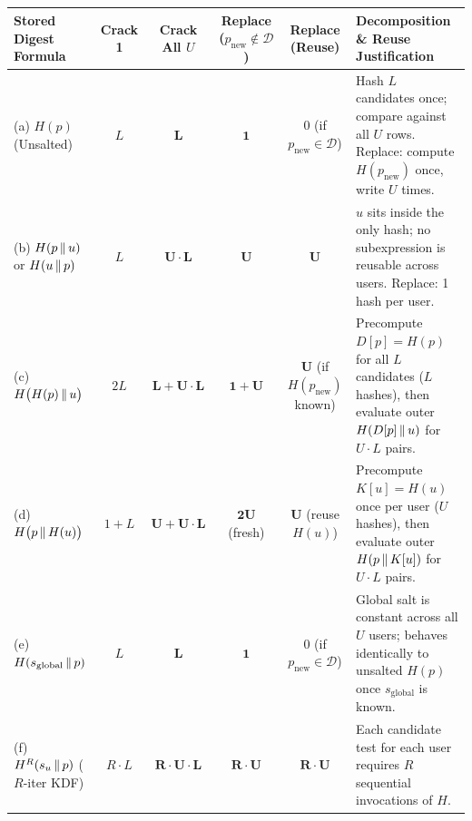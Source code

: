 \begin{table}[h!]
\centering
\footnotesize
\begin{tabularx}{\textwidth}{@{}L{3.5cm} c c c c Y@{}}
\toprule
\textbf{Stored Digest Formula} & \textbf{Crack 1} & \textbf{Crack All $U$} & \textbf{Replace ($p_{\text{new}} \notin \mathcal{D}$)} & \textbf{Replace (Reuse)} & \textbf{Decomposition \& Reuse Justification} \\
\midrule
(a) $H(p)$ (Unsalted) & $L$ & $\mathbf{L}$ & $\mathbf{1}$ & $0$ (if $p_{\text{new}} \in \mathcal{D}$) & Hash $L$ candidates once; compare against all $U$ rows. Replace: compute $H(p_{\text{new}})$ once, write $U$ times. \\
(b) $H(p \,\|\, u)$ or $H(u \,\|\, p)$ & $L$ & $\mathbf{U \cdot L}$ & $\mathbf{U}$ & $\mathbf{U}$ & $u$ sits inside the only hash; no subexpression is reusable across users. Replace: 1 hash per user. \\
(c) $H\big(H(p) \,\|\, u\big)$ & $2L$ & $\mathbf{L + U \cdot L}$ & $\mathbf{1 + U}$ & $\mathbf{U}$ (if $H(p_{\text{new}})$ known) & Precompute $D[p] = H(p)$ for all $L$ candidates ($L$ hashes), then evaluate outer $H(D[p] \,\|\, u)$ for $U \cdot L$ pairs. \\
(d) $H\big(p \,\|\, H(u)\big)$ & $1 + L$ & $\mathbf{U + U \cdot L}$ & $\mathbf{2U}$ (fresh) & $\mathbf{U}$ (reuse $H(u)$) & Precompute $K[u] = H(u)$ once per user ($U$ hashes), then evaluate outer $H(p \,\|\, K[u])$ for $U \cdot L$ pairs. \\
(e) $H(s_{\text{global}} \,\|\, p)$ & $L$ & $\mathbf{L}$ & $\mathbf{1}$ & $0$ (if $p_{\text{new}} \in \mathcal{D}$) & Global salt is constant across all $U$ users; behaves identically to unsalted $H(p)$ once $s_{\text{global}}$ is known. \\
(f) $H^R(s_u \,\|\, p)$ ($R$-iter KDF) & $R \cdot L$ & $\mathbf{R \cdot U \cdot L}$ & $\mathbf{R \cdot U}$ & $\mathbf{R \cdot U}$ & Each candidate test for each user requires $R$ sequential invocations of $H$. \\
\bottomrule
\end{tabularx}
\end{table}


